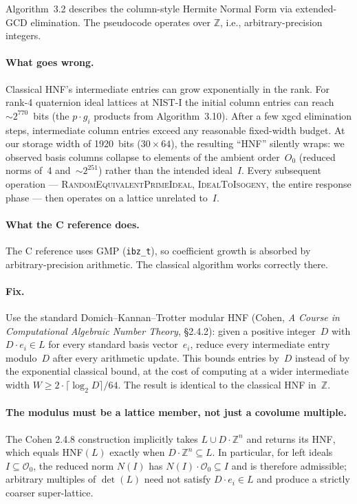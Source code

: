\documentclass[a4paper,11pt]{article}
\newcommand{\algo}[1]{Algorithm~#1}
\begin{document}
\algo{3.2} describes the column-style Hermite Normal Form via
extended-GCD elimination.  The pseudocode operates over
$\mathbb{Z}$, i.e., arbitrary-precision integers.

\paragraph{What goes wrong.}
Classical HNF's intermediate entries can grow exponentially in
the rank.  For rank-4 quaternion ideal lattices at NIST-I the
initial column entries can reach ${\sim}2^{770}$~bits (the
$p \cdot g_i$ products from \algo{3.10}).  After a few xgcd
elimination steps, intermediate column entries exceed any
reasonable fixed-width budget.  At our storage width of 1920~bits
($30 \times 64$), the resulting ``HNF'' silently wraps: we
observed basis columns collapse to elements of the ambient
order~$O_0$ (reduced norms of~4 and~${\sim}2^{251}$) rather
than the intended ideal~$I$.  Every subsequent operation ---
\textsc{RandomEquivalentPrimeIdeal}, \textsc{IdealToIsogeny},
the entire response phase --- then operates on a lattice unrelated
to~$I$.

\paragraph{What the C reference does.}
The C reference uses GMP (\texttt{ibz\_t}), so coefficient growth
is absorbed by arbitrary-precision arithmetic.  The classical
algorithm works correctly there.

\paragraph{Fix.}
Use the standard Domich--Kannan--Trotter modular HNF (Cohen,
\emph{A Course in Computational Algebraic Number Theory},
\S2.4.2): given a positive integer~$D$ with $D \cdot e_i \in L$
for every standard basis vector~$e_i$, reduce every intermediate
entry modulo~$D$ after every arithmetic update.  This bounds
entries by~$D$ instead of by the exponential classical bound, at
the cost of computing at a wider intermediate width
$W \geq 2 \cdot \lceil\log_2 D\rceil / 64$.  The result is
identical to the classical HNF in~$\mathbb{Z}$.

\paragraph{The modulus must be a lattice member, not just a
covolume multiple.}
The Cohen 2.4.8 construction implicitly takes
$L \cup D\cdot\mathbb{Z}^n$ and returns its HNF, which equals
HNF$(L)$ exactly when $D \cdot \mathbb{Z}^n \subseteq L$.  In
particular, for left ideals~$I \subseteq \mathcal{O}_0$, the
reduced norm $N(I)$ has $N(I) \cdot \mathcal{O}_0 \subseteq I$
and is therefore admissible; arbitrary multiples of $\det(L)$
need not satisfy $D \cdot e_i \in L$ and produce a strictly
coarser super-lattice.
\end{document}
